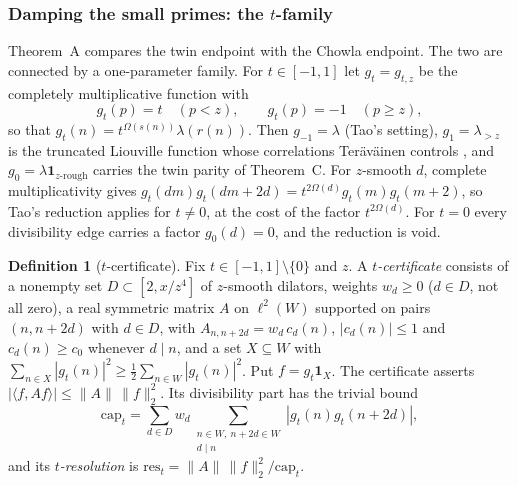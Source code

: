\documentclass[11pt]{amsart}
\theoremstyle{definition}
\newtheorem{definition}[theorem]{Definition}
\theoremstyle{remark}
\newcommand{\res}{\mathrm{res}}
\newcommand{\capR}{\mathrm{cap}}
\begin{document}
\subsubsection*{Damping the small primes: the $t$-family}
Theorem~A compares the twin endpoint with the Chowla endpoint. The two are connected by a one-parameter family. For $t\in[-1,1]$ let $g_t=g_{t,z}$ be the completely multiplicative function with
\[
g_t(p)=t\quad(p<z),\qquad g_t(p)=-1\quad(p\ge z),
\]
so that $g_t(n)=t^{\Omega(s(n))}\lambda(r(n))$. Then $g_{-1}=\lambda$ (Tao's setting), $g_1=\lambda_{>z}$ is the truncated Liouville function whose correlations Teräväinen controls \cite[Thm.~1.4, Rem.~1.12]{Ter18}, and $g_0=\lambda\mathbf 1_{z\text{-rough}}$ carries the twin parity of Theorem~C. For $z$-smooth $d$, complete multiplicativity gives $g_t(dm)g_t(dm+2d)=t^{2\Omega(d)}g_t(m)g_t(m+2)$, so Tao's reduction applies for $t\ne0$, at the cost of the factor $t^{2\Omega(d)}$. For $t=0$ every divisibility edge carries a factor $g_0(d)=0$, and the reduction is void.

\begin{definition}[$t$-certificate]\label{def:tcert}
Fix $t\in[-1,1]\setminus\{0\}$ and $z$. A \emph{$t$-certificate} consists of a nonempty set $D\subset[2,x/z^4]$ of $z$-smooth dilators, weights $w_d\ge0$ ($d\in D$, not all zero), a real symmetric matrix $A$ on $\ell^2(W)$ supported on pairs $(n,n+2d)$ with $d\in D$, with $A_{n,n+2d}=w_d\,c_d(n)$, $|c_d(n)|\le1$ and $c_d(n)\ge c_0$ whenever $d\mid n$, and a set $X\subseteq W$ with $\sum_{n\in X}|g_t(n)|^2\ge\frac12\sum_{n\in W}|g_t(n)|^2$. Put $f=g_t\mathbf 1_X$. The certificate asserts $|\langle f,Af\rangle|\le\|A\|\,\|f\|_2^2$. Its divisibility part has the trivial bound
\[
\capR_t=\sum_{d\in D}w_d\sum_{\substack{n\in W,\ n+2d\in W\\ d\mid n}}|g_t(n)g_t(n+2d)|,
\]
and its \emph{$t$-resolution} is $\res_t=\|A\|\,\|f\|_2^2/\capR_t$.
\end{definition}
\end{document}

